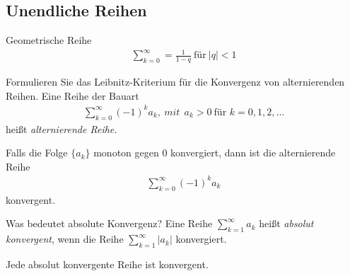 \subsection{Unendliche Reihen}
\begin{karte}{Geometrische Reihe}
	\begin{align}
		\sum_{k=0}^{\infty} =\frac{1}{1-q}\ \text{für} \ \lvert q\rvert < 1 
	\end{align}
\end{karte}

\begin{karte}{Formulieren Sie das Leibnitz-Kriterium für die Konvergenz von alternierenden Reihen.}
	{\large Eine Reihe der Bauart
		\begin{align}
			\sum_{k=0}^{\infty} {(-1)}^{k} a_k, \ mit \ \ a_k > 0\ \text{für }k=0,1,2,\dots 
		\end{align}
		heißt \emph{alternierende Reihe.}}\vspace{5mm}\par
	Falls die Folge \( \{ a_k \} \) monoton gegen 0 konvergiert, dann ist die alternierende Reihe
	\begin{align}
		\sum_{k=0}^{\infty}{(-1)}^k a_k 
	\end{align}
	konvergent.
\end{karte}

\begin{karte}{Was bedeutet absolute Konvergenz?}
	Eine Reihe \(\sum_{k=1}^{\infty}a_k\) heißt \emph{absolut konvergent}, wenn die Reihe \(\sum_{k=1}^{\infty}\lvert a_k \rvert \) konvergiert. \vspace{5mm}\par
	Jede absolut konvergente Reihe ist konvergent.
\end{karte}

